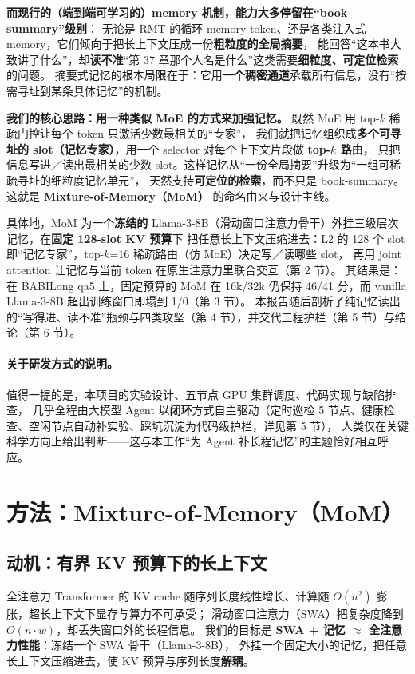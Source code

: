 \documentclass[11pt,a4paper]{ctexart}
\begin{document}
\textbf{而现行的（端到端可学习的）memory 机制，能力大多停留在“book summary”级别}：
无论是 RMT 的循环 memory token、还是各类注入式 memory，它们倾向于把长上下文压成一份\textbf{粗粒度的全局摘要}，
能回答“这本书大致讲了什么”，却\textbf{读不准}“第 37 章那个人名是什么”这类需要\textbf{细粒度、可定位检索}的问题。
摘要式记忆的根本局限在于：它用\textbf{一个稠密通道}承载所有信息，没有“按需寻址到某条具体记忆”的机制。

\textbf{我们的核心思路：用一种类似 MoE 的方式来加强记忆。} 既然 MoE 用 top-$k$ 稀疏门控让每个 token 只激活少数最相关的“专家”，
我们就把记忆组织成\textbf{多个可寻址的 slot（记忆专家）}，用一个 selector 对每个上下文片段做 \textbf{top-$k$ 路由}，
只把信息写进／读出最相关的少数 slot。这样记忆从“一份全局摘要”升级为“一组可稀疏寻址的细粒度记忆单元”，
天然支持\textbf{可定位的检索}，而不只是 book-summary。这就是 \textbf{Mixture-of-Memory（MoM）} 的命名由来与设计主线。

具体地，MoM 为一个\textbf{冻结的} Llama-3-8B（滑动窗口注意力骨干）外挂三级层次记忆，在\textbf{固定 128-slot KV 预算}下
把任意长上下文压缩进去：L2 的 128 个 slot 即“记忆专家”，top-$k$=16 稀疏路由（仿 MoE）决定写／读哪些 slot，
再用 joint attention 让记忆与当前 token 在原生注意力里联合交互（第 2 节）。
其结果是：在 BABILong qa5 上，固定预算的 MoM 在 16k/32k 仍保持 46/41 分，而 vanilla Llama-3-8B 超出训练窗口即塌到 1/0（第 3 节）。
本报告随后剖析了纯记忆读出的“写得进、读不准”瓶颈与四类攻坚（第 4 节），并交代工程护栏（第 5 节）与结论（第 6 节）。

\paragraph{关于研发方式的说明。} 值得一提的是，本项目的实验设计、五节点 GPU 集群调度、代码实现与缺陷排查，
几乎全程由大模型 Agent 以\textbf{闭环}方式自主驱动（定时巡检 5 节点、健康检查、空闲节点自动补实验、踩坑沉淀为代码级护栏，详见第 5 节），
人类仅在关键科学方向上给出判断——这与本工作“为 Agent 补长程记忆”的主题恰好相互呼应。

\section{方法：Mixture-of-Memory（MoM）}
\subsection{动机：有界 KV 预算下的长上下文}
全注意力 Transformer 的 KV cache 随序列长度线性增长、计算随 $O(n^2)$ 膨胀，超长上下文下显存与算力不可承受；
滑动窗口注意力（SWA）把复杂度降到 $O(n\cdot w)$，却丢失窗口外的长程信息。
我们的目标是 \textbf{SWA + 记忆 $\approx$ 全注意力性能}：冻结一个 SWA 骨干（Llama-3-8B），
外挂一个固定大小的记忆，把任意长上下文压缩进去，使 KV 预算与序列长度\textbf{解耦}。
\end{document}
